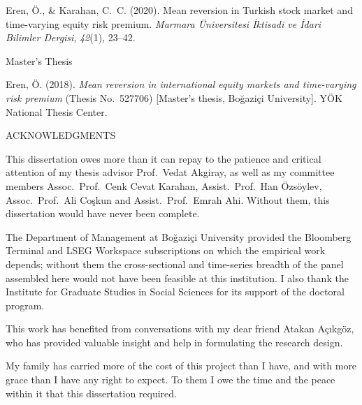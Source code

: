 \documentclass[12pt, oneside]{report}
\begin{document}
\noindent Eren, \"{O}., \& Karahan, C.~C. (2020).
        Mean reversion in Turkish stock market and time-varying equity risk premium.
        \textit{Marmara \"{U}niversitesi \.{I}ktisadi ve \.{I}dari Bilimler Dergisi}, \textit{42}(1), 23--42.

\vspace{12pt}

\noindent Master's Thesis

\noindent Eren, \"{O}. (2018). \textit{Mean reversion in international equity markets
        and time-varying risk premium} (Thesis No.~527706) [Master's thesis,
        Boğaziçi University]. YÖK National Thesis Center.

\clearpage

\thispagestyle{plain}
\begin{center}
ACKNOWLEDGMENTS
\end{center}

\noindent This dissertation owes more than it can repay to the patience and
critical attention of my thesis advisor Prof.\ Vedat Akgiray, as well as my committee members Assoc.\ Prof.\ Cenk Cevat Karahan, 
Assist.\ Prof.\ Han Özsöylev, Assoc.\ Prof.\ Ali Coşkun and Assist.\ Prof.\ Emrah Ahi. Without them, this dissertation would have never 
been complete.

The Department of Management at Boğaziçi University provided the Bloomberg
Terminal and LSEG Workspace subscriptions on which the empirical work
depends; without them the cross-sectional and time-series breadth of the
panel assembled here would not have been feasible at this institution. I also
thank the Institute for Graduate Studies in Social Sciences for its support
of the doctoral program.

This work has benefited from conversations with my dear friend Atakan Açıkgöz, who has provided valuable insight and help in formulating the research design.

My family has carried more of the cost of this project than I have, and with
more grace than I have any right to expect. To them I owe the time and the
peace within it that this dissertation required.

\clearpage

\tableofcontents
\clearpage

\listoftables
\clearpage
\end{document}
